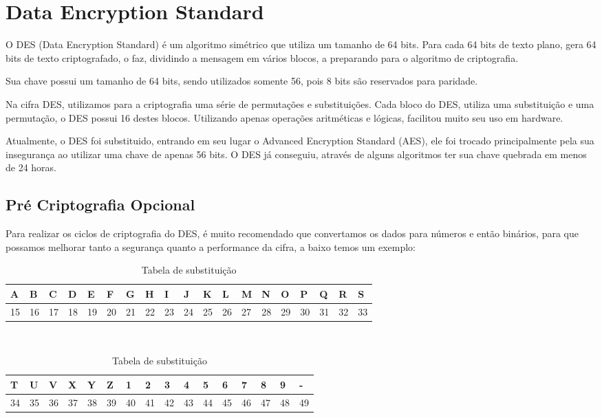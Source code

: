 \documentclass[
	article,			%
	12pt,				%
	oneside,			%
	a4paper,			%
	english,			%
	brazil,				%
	sumario=tradicional
	]{abntex2}
\begin{document}
\section{Data Encryption Standard}

O DES (Data Encryption Standard) é um algoritmo simétrico que utiliza um tamanho de 64 bits. Para cada 64 bits de texto plano, gera 64 bits de texto criptografado, o faz, dividindo a mensagem em vários blocos, a preparando para o algoritmo de criptografia.

Sua chave possui um tamanho de 64 bits, sendo utilizados somente 56, pois 8 bits são reservados para paridade.

Na cifra DES, utilizamos para a criptografia uma série de permutações e substituições. Cada bloco do DES, utiliza uma substituição e uma permutação, o DES possui 16 destes blocos. Utilizando apenas operações aritméticas e lógicas, facilitou muito seu uso em hardware.

Atualmente, o DES foi substituido, entrando em seu lugar o Advanced Encryption Standard (AES), ele foi trocado principalmente pela sua insegurança ao utilizar uma chave de apenas 56 bits. O DES já conseguiu, através de alguns algoritmos ter sua chave quebrada em menos de 24 horas.


\subsection{Pré Criptografia Opcional}

Para realizar os ciclos de criptografia do DES, é muito recomendado que convertamos os dados para números e então binários, para que possamos melhorar tanto a segurança quanto a performance da cifra, a baixo temos um exemplo:

\begin{table}[h]
\centering
\caption{Tabela de substituição}
\label{my-label}
\begin{tabular}{|l|l|l|l|l|l|l|l|l|l|l|l|l|l|l|l|l|l|l|}
\hline
A  & B  & C  & D  & E  & F  & G  & H  & I  & J  & K  & L  & M  & N  & O  & P  & Q  & R  & S  \\ \hline
15 & 16 & 17 & 18 & 19 & 20 & 21 & 22 & 23 & 24 & 25 & 26 & 27 & 28 & 29 & 30 & 31 & 32 & 33 \\ \hline
\end{tabular}
\\
\begin{tabular}{|l|l|l|l|l|l|l|l|l|l|l|l|l|l|l|l|}
\hline
T  & U  & V  & X  & Y  & Z  & 1  & 2  & 3  & 4  & 5  & 6  & 7  & 8  & 9  & - \\ \hline
34 & 35 & 36 & 37 & 38 & 39 & 40 & 41 & 42 & 43 & 44 & 45 & 46 & 47 & 48 & 49 \\ \hline
\end{tabular}
\end{table}
\end{document}
